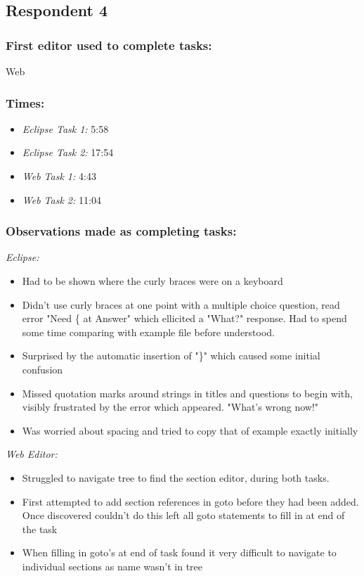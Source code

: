 \subsection{Respondent 4}
\subsubsection*{First editor used to complete tasks:} Web
\subsubsection*{Times:}
\begin{itemize}
\item \emph{Eclipse Task 1:} 5:58
\item \emph{Eclipse Task 2:} 17:54
\item \emph{Web Task 1:} 4:43
\item \emph{Web Task 2:} 11:04
\end{itemize}
\subsubsection*{Observations made as completing tasks:}

\emph{Eclipse:}
\begin{itemize}
\item Had to be shown where the curly braces were on a keyboard
\item Didn't use curly braces at one point with a multiple choice question, read error "Need \{ at Answer" which ellicited a "What?" response. Had to spend some time comparing with example file before understood.
\item Surprised by the automatic insertion of "\}" which caused some initial confusion
\item Missed quotation marks around strings in titles and questions to begin with, visibly frustrated by the error which appeared. "What's wrong now!"
\item Was worried about spacing and tried to copy that of example exactly initially 
\end{itemize}
\emph{Web Editor:}
\begin{itemize}
\item Struggled to navigate tree to find the section editor, during both tasks. 
\item First attempted to add section references in goto before they had been added. Once discovered couldn't do this left all goto statements to fill in at end of the task
\item When filling in goto's at end of task found it very difficult to navigate to individual sections as name wasn't in tree
\end{itemize}

